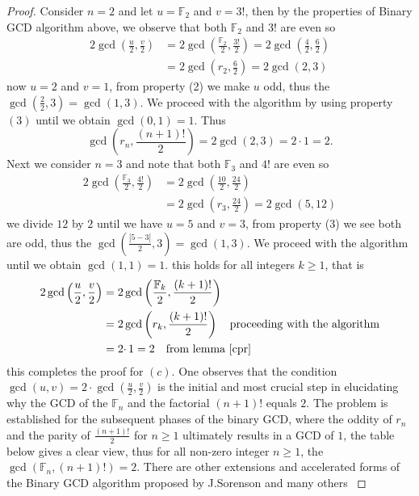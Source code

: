 \documentclass[pdflatex,sn-mathphys-num]{sn-jnl}%
\theoremstyle{thmstyleone}%
\theoremstyle{thmstyletwo}%
\theoremstyle{thmstylethree}%
\begin{document}
\begin{proof}
Consider $n=2$ and let $u=\mathbb{F}_2$ and $v=3!$, then by the properties of Binary GCD algorithm above, we observe that both $ \mathbb{F}_2$ and $3!$ are even so 
\begin{align*}
    2\gcd\left(\frac{u}{2}, \frac{v}{2}\right)&= 2\gcd\left(\frac{\mathbb{F}_{2}}{2}, \frac{3!}{2}\right)=2 \gcd\left(\frac{4}{2}, \frac{6}{2}\right)\\
    &=2\gcd \left(r_2, \frac{6}{2}\right)=2\gcd(2,3)
\end{align*}
now $u=2$ and $v=1$, from property (2) we make $u$ odd, thus the $\gcd(\frac{2}{2},3)=\gcd(1,3)$. We proceed with the algorithm by using property $(3)$ until we obtain $\gcd(0,1)=1.$ Thus 
$$\gcd \left(r_n, \frac{(n+1)!}{2}\right)=2\gcd(2,3)=2\cdotp 1=2.$$
Next we consider $n=3$ and note that both $ \mathbb{F}_3$ and $4!$ are even so 
\begin{align*}
     2\gcd\left(\frac{\mathbb{F}_{3}}{2}, \frac{4!}{2}\right)&=2 \gcd\left(\frac{10}{2}, \frac{24}{2}\right)\\
    &=2\gcd \left(r_3, \frac{24}{2}\right)=2\gcd(5,12)
\end{align*}
we divide $12$ by $2$ until we have 
$u=5$ and $v=3$, from property (3) we see both are odd, thus the $\gcd\left(\frac{|5-3|}{2}, 3\right)=\gcd(1,3)$. We proceed with the algorithm until we obtain $\gcd(1,1)=1.$
this holds for all integers $k\geq 1$, that is
\begin{align*}
    2\gcd\left(\frac{u}{2}, \frac{v}{2}\right)&= 2\gcd\left(\frac{\mathbb{F}_{k}}{2}, \frac{(k+1)!}{2}\right)\\
    &=2\gcd \left(r_k, \frac{(k+1)!}{2}\right) \quad \mbox{proceeding with the algorithm}\\
    &=2\cdotp 1=2 \quad \mbox{from lemma $\ref{cpr}$}
\end{align*}
this completes the proof for $(c).$
One observes that the condition $\gcd(u,v) = 2 \cdotp \gcd\left(\frac{u}{2}, \frac{v}{2}\right)$ is the initial and most crucial step in elucidating why the GCD of the $\mathbb{F}_{n}$ and the factorial $(n+1)!$ equals $2$. The problem is established for the subsequent phases of the binary GCD, where the oddity of $r_n$ and the parity of $\frac{(n+1)!}{2}$ for $n\geq1$ ultimately results in a GCD of $1$, the table below gives a clear view, thus for all non-zero integer $n\geq 1$, the $\gcd(\mathbb{F}_{n},(n+1)!)=2$. There are other extensions and accelerated forms of the Binary GCD algorithm proposed by J.Sorenson and many others \cite{brent1985systolic, sorenson1990k, sorenson1994two}


\end{proof}
\end{document}
